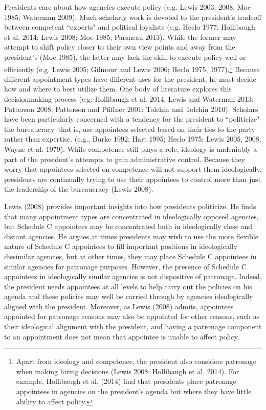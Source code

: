 \documentclass[12pt]{article}
\begin{document}
	Presidents care about how agencies execute policy (e.g. Lewis 2003; 2008; Moe 1985; Waterman 2009). Much scholarly work is devoted to the president's tradeoff between competent ``experts" and political loyalists (e.g. Heclo 1977; Hollibaugh et al. 2014; Lewis 2008; Moe 1985; Parsneau 2013). While the former may attempt to shift policy closer to their own view points and away from the president's (Moe 1985), the latter may lack the skill to execute policy well or efficiently (e.g. Lewis 2005; Gilmour and Lewis 2006; Heclo 1975, 1977).\footnote{Apart from ideology and competence, the president also considers patronage when making hiring decisions (Lewis 2008; Hollibaugh et al. 2014). For example, Hollibaugh et al. (2014) find that presidents place patronage appointees in agencies on the president's agenda but where they have little ability to affect policy.} Because different appointment types have different uses for the president, he must decide how and where to best utilize them. One body of literature explores this decisionmaking process (e.g. Hollibaugh et al. 2014; Lewis and Waterman 2013; Patterson 2008; Patterson and Pfiffner 2001; Tolchin and Tolchin 2010). Scholars have been particularly concerned with a tendency for the president to ``politicize" the bureaucracy--that is, use appointees selected based on their ties to the party rather than expertise. (e.g., Burke 1992; Hart 1995; Heclo 1975; Lewis 2005, 2008; Wayne et al. 1979). While competence still plays a role, ideology is undeniably a part of the president's attempts to gain administrative control. Because they worry that appointees selected on competence will not support them ideologically, presidents are continually trying to use their appointees to control more than just the leadership of the bureaucracy (Lewis 2008).

Lewis (2008) provides important insights into how presidents politicize. He finds that many appointment types are concentrated in ideologically opposed agencies, but Schedule C appointees may be concentrated both in ideologically close and distant agencies. He argues at times presidents may wish to use the more flexible nature of Schedule C appointees to fill important positions in ideologically dissimilar agencies, but at other times, they may place Schedule C appointees in similar agencies for patronage purposes. However, the presence of Schedule C appointees in ideologically similar agencies is not dispositive of patronage. Indeed, the president needs appointees at all levels to help carry out the policies on his agenda and these policies may well be carried through by agencies ideologically aligned with the president. Moreover, as Lewis (2008) admits, appointees appointed for patronage reasons may also be appointed for other reasons, such as their ideological alignment with the president, and having a patronage component to an appointment does not mean that appointee is unable to affect policy. 
\end{document}
